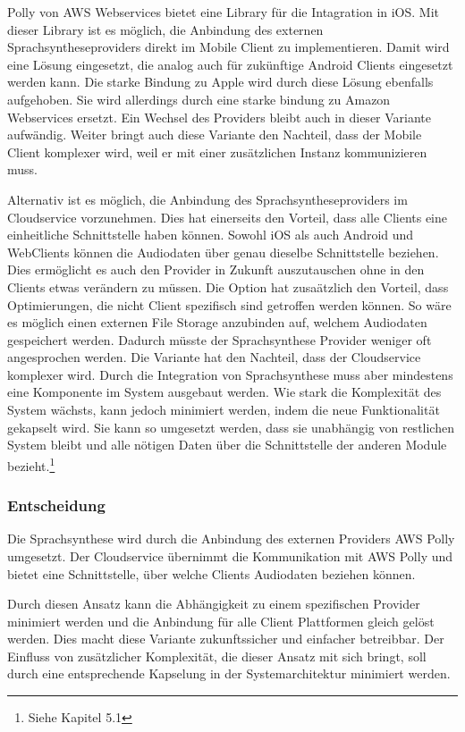 Polly von AWS Webservices bietet eine Library für die Intagration in iOS. \cite{aws_polly_ios}
Mit dieser Library ist es möglich, die Anbindung des externen Sprachsyntheseproviders direkt im Mobile Client zu implementieren.
Damit wird eine Lösung eingesetzt, die analog auch für zukünftige Android Clients eingesetzt werden kann.
Die starke Bindung zu Apple wird durch diese Lösung ebenfalls aufgehoben.
Sie wird allerdings durch eine starke bindung zu Amazon Webservices ersetzt.
Ein Wechsel des Providers bleibt auch in dieser Variante aufwändig.
Weiter bringt auch diese Variante den Nachteil, dass der Mobile Client komplexer wird, weil er mit einer zusätzlichen Instanz kommunizieren muss.

\clearpage

Alternativ ist es möglich, die Anbindung des Sprachsyntheseproviders im Cloudservice vorzunehmen.
Dies hat einerseits den Vorteil, dass alle Clients eine einheitliche Schnittstelle haben können.
Sowohl iOS als auch Android und WebClients können die Audiodaten über genau dieselbe Schnittstelle beziehen.
Dies ermöglicht es auch den Provider in Zukunft auszutauschen ohne in den Clients etwas verändern zu müssen.
Die Option hat zusaätzlich den Vorteil, dass Optimierungen, die nicht Client spezifisch sind getroffen werden können.
So wäre es möglich einen externen File Storage anzubinden auf, welchem Audiodaten gespeichert werden.
Dadurch müsste der Sprachsynthese Provider weniger oft angesprochen werden.
Die Variante hat den Nachteil, dass der Cloudservice komplexer wird.
Durch die Integration von Sprachsynthese muss aber mindestens eine Komponente im System ausgebaut werden.
Wie stark die Komplexität des System wächsts, kann jedoch minimiert werden, indem die neue Funktionalität gekapselt wird.
Sie kann so umgesetzt werden, dass sie unabhängig von restlichen System bleibt und alle nötigen Daten über die Schnittstelle der anderen Module bezieht.\footnote{Siehe Kapitel 5.1}

\subsubsection{Entscheidung}

Die Sprachsynthese wird durch die Anbindung des externen Providers AWS Polly umgesetzt.
Der Cloudservice übernimmt die Kommunikation mit AWS Polly und bietet eine Schnittstelle, über welche Clients Audiodaten beziehen können.

Durch diesen Ansatz kann die Abhängigkeit zu einem spezifischen Provider minimiert werden und die Anbindung für alle Client Plattformen gleich gelöst werden.
Dies macht diese Variante zukunftssicher und einfacher betreibbar.
Der Einfluss von zusätzlicher Komplexität, die dieser Ansatz mit sich bringt, soll durch eine entsprechende Kapselung in der Systemarchitektur minimiert werden.

\clearpage
